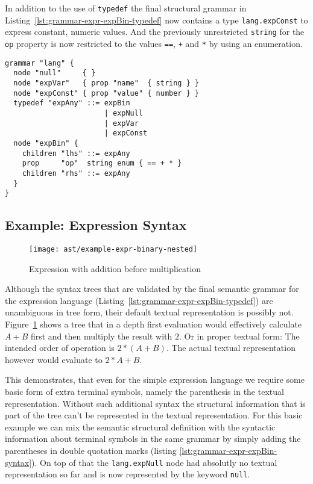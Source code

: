 \documentclass[sigconf,natbib=false]{acmart}
\newcommand\astScale{0.7}
\begin{document}
In addition to the use of \texttt{typedef} the final structural grammar in Listing~\ref{lst:grammar-expr-expBin-typedef} now contains a type \texttt{lang.expConst} to express constant, numeric values. And the previously unrestricted \texttt{string} for the \texttt{op} property is now restricted to the values \texttt{==}, \texttt{+} and \texttt{*} by using an enumeration.

\begin{lstlisting}[caption={Final structural grammar for expressions}, label=lst:grammar-expr-expBin-typedef]
grammar "lang" {
  node "null"     { }
  node "expVar"   { prop "name"  { string } }
  node "expConst" { prop "value" { number } }
  typedef "expAny" ::= expBin
                       | expNull
                       | expVar
                       | expConst
  node "expBin" {
    children "lhs" ::= expAny
    prop     "op"  string enum { == + * }
    children "rhs" ::= expAny
  }
}
\end{lstlisting}

\subsection{Example: Expression Syntax}

\begin{figure}
  \texttt{[image: ast/example-expr-binary-nested]}
  \caption{Expression with addition before multiplication}
  \label{fig:ast-nested-ambiguous}
\end{figure}

Although the syntax trees that are validated by the final semantic grammar for the expression language (Listing~\ref{lst:grammar-expr-expBin-typedef}) are unambiguous in tree form, their default textual representation is possibly not. Figure~\ref{fig:ast-nested-ambiguous} shows a tree that in a depth first evaluation would effectively calculate $A+B$ first and then multiply the result with $2$. Or in proper textual form: The intended order of operation is $2 * (A+B)$. The actual textual representation however would evaluate to $2 * A + B$.

This demonstrates, that even for the simple expression language we require some basic form of extra terminal symbols, namely the parenthesis in the textual representation. Without such additional syntax the structural information that is part of the tree can't be represented in the textual representation. For this basic example we can mix the semantic structural definition with the syntactic information about terminal symbols in the same grammar by simply adding the parentheses in double quotation marks (listing \ref{lst:grammar-expr-expBin-syntax}). On top of that the \texttt{lang.expNull} node had absolutly no textual representation so far and is now represented by the keyword \texttt{null}.
\end{document}
